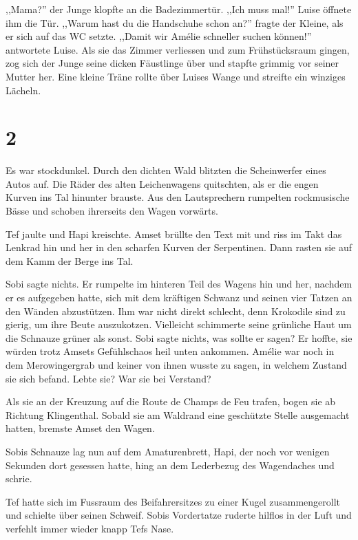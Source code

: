 ,,Mama?'' der Junge klopfte an die Badezimmertür. ,,Ich muss mal!'' Luise öffnete ihm die Tür. ,,Warum hast du die Handschuhe schon an?'' fragte der Kleine, als er sich auf das WC setzte. ,,Damit wir Amélie schneller suchen können!'' antwortete Luise. Als sie das Zimmer verliessen und zum Frühstücksraum gingen, zog sich der Junge seine dicken Fäustlinge über und stapfte grimmig vor seiner Mutter her. Eine kleine Träne rollte über Luises Wange und streifte ein winziges Lächeln.

\section*{2}






 Es war stockdunkel. Durch den dichten Wald blitzten die Scheinwerfer eines Autos auf. Die Räder des alten Leichenwagens quitschten, als er die engen Kurven ins Tal hinunter brauste. Aus den Lautsprechern rumpelten rockmusische Bässe und schoben ihrerseits den Wagen vorwärts. 

Tef jaulte und Hapi kreischte. Amset brüllte den Text mit und riss im Takt das Lenkrad hin und her in den scharfen Kurven der Serpentinen. Dann rasten sie auf dem Kamm der Berge ins Tal.

Sobi sagte nichts. Er rumpelte im hinteren Teil des Wagens hin und her, nachdem er es aufgegeben hatte, sich mit dem kräftigen Schwanz und seinen vier Tatzen an den Wänden abzustützen. Ihm war nicht direkt schlecht, denn Krokodile sind zu gierig, um ihre Beute auszukotzen. Vielleicht schimmerte seine grünliche Haut um die Schnauze grüner als sonst. Sobi sagte nichts, was sollte er sagen? Er hoffte, sie würden trotz Amsets Gefühlschaos heil unten ankommen. Amélie war noch in dem Merowingergrab und keiner von ihnen wusste zu sagen, in welchem Zustand sie sich befand. Lebte sie? War sie bei Verstand?

Als sie an der Kreuzung auf die Route de Champs de Feu trafen, bogen sie ab Richtung Klingenthal. Sobald sie am Waldrand eine geschützte Stelle ausgemacht hatten, bremste Amset den Wagen. 

Sobis Schnauze lag nun auf dem Amaturenbrett, Hapi, der noch vor wenigen Sekunden dort gesessen hatte, hing an dem Lederbezug des Wagendaches und schrie.

Tef hatte sich im Fussraum des Beifahrersitzes zu einer Kugel zusammengerollt und schielte über seinen Schweif. Sobis Vordertatze ruderte hilflos in der Luft und verfehlt immer wieder knapp Tefs Nase. 

